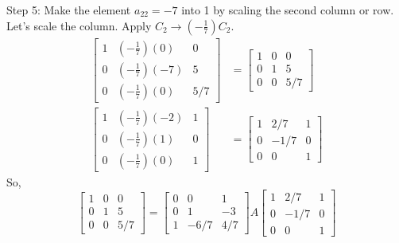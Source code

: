 \documentclass{article}
\begin{document}
Step 5: Make the element $a_{22}=-7$ into 1 by scaling the second column or row. Let's scale the column.
Apply $C_2 \to (-\frac{1}{7})C_2$.
\begin{align*} \begin{bmatrix} 1 & (-\frac{1}{7})(0) & 0 \\ 0 & (-\frac{1}{7})(-7) & 5 \\ 0 & (-\frac{1}{7})(0) & 5/7 \end{bmatrix} &= \begin{bmatrix} 1 & 0 & 0 \\ 0 & 1 & 5 \\ 0 & 0 & 5/7 \end{bmatrix} \\ \begin{bmatrix} 1 & (-\frac{1}{7})(-2) & 1 \\ 0 & (-\frac{1}{7})(1) & 0 \\ 0 & (-\frac{1}{7})(0) & 1 \end{bmatrix} &= \begin{bmatrix} 1 & 2/7 & 1 \\ 0 & -1/7 & 0 \\ 0 & 0 & 1 \end{bmatrix}\end{align*}
So,
\[ \begin{bmatrix} 1 & 0 & 0 \\ 0 & 1 & 5 \\ 0 & 0 & 5/7 \end{bmatrix} = \begin{bmatrix} 0 & 0 & 1 \\ 0 & 1 & -3 \\ 1 & -6/7 & 4/7 \end{bmatrix} A \begin{bmatrix} 1 & 2/7 & 1 \\ 0 & -1/7 & 0 \\ 0 & 0 & 1 \end{bmatrix} \]
\end{document}
